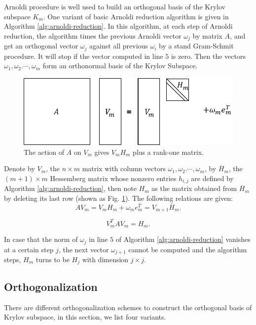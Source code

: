 Arnoldi procedure is well used to build an orthogonal basis of the Krylov subspace $K_m$. One variant of basic Arnoldi reduction algorithm is given in Algorithm \ref{alg:arnoldi-reduction}. In this algorithm, at each step of Arnoldi reduction, the algorithm times the previous Arnoldi vector $\omega_j$ by matrix $A$, and get an orthogonal vector $\omega_j$ against all previous $\omega_i$ by a stand Gram-Schmit procedure. It will stop if the vector computed in line $5$ is zero. Then the vectors $\omega_1, \omega_2. \cdots, \omega_m$ form an orthonormal basis of the Krylov Subspace. 

\begin{figure}[htbp]
	\centering
	\includegraphics[width=5.8in]{fig/arnoldi_reduction.pdf}
	\caption{ The action of $A$ on $V_m$ gives $V_mH_m$ plus a rank-one matrix.}
	\label{arnoldi}
\end{figure}

Denote by $V_m$, the $n \times m$ matrix with column vectors $\omega_1, \omega_2. \cdots, \omega_m$, by $\overline{H}_m$, the $(m+1) \times m$ Hessemberg matrix whose nonzero entries $h_{i,j}$ are defined by  Algorithm \ref{alg:arnoldi-reduction}, then note $H_m$ as the matrix obtained from  $\overline{H}_m$ by deleting its last row (shown as Fig. \ref{arnoldi}). The following relations are given:
\begin{equation}
AV_m = V_m H_m + \omega_me_m^T = V_{m+1}\bar{H}_m.
\end{equation}

\begin{equation}
V_m^T A V_m = H_m.
\end{equation}

In case that the norm of $\omega_j$ in line $5$ of  Algorithm \ref{alg:arnoldi-reduction} vanishes at a certain step $j$, the next vector $\omega_{j+1}$ cannot be computed and the algorithm steps, $H_m$ turns to be $H_j$ with dimension $j \times j$.


\subsection{Orthogonalization}
There are different orthogonalization schemes to construct the orthogonal basis of Krylov subspace, in this section, we list four variants.

